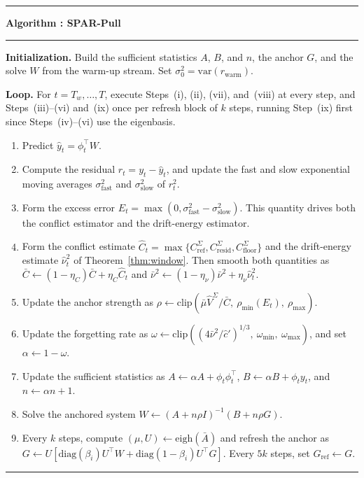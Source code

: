 \documentclass[10pt]{article}
\newcounter{algorithm}
\begin{document}
\label{alg:spar-pull}
\noindent\begin{minipage}{\textwidth}
\hrule\vspace{3pt}
\noindent\textbf{Algorithm \thealgorithm: SPAR-Pull}\vspace{3pt}\hrule\vspace{3pt}
{\footnotesize
\textbf{Initialization.} Build the sufficient statistics $A$, $B$, and $n$, the anchor $G$, and the solve $W$ from the warm-up stream. Set $\sigma^2_0 = \mathrm{var}(r_{\mathrm{warm}})$.

\textbf{Loop.} For $t = T_w,\dots,T$, execute Steps~(i), (ii), (vii), and~(viii) at every step, and Steps~(iii)--(vi) and~(ix) once per refresh block of $k$ steps, running Step~(ix) first since Steps~(iv)--(vi) use the eigenbasis.
\begin{enumerate}
\renewcommand{\labelenumi}{(\roman{enumi})}
\setlength{\itemsep}{1pt}
\setlength{\parsep}{0pt}
\setlength{\topsep}{2pt}
\setlength{\partopsep}{0pt}
\item Predict $\hat y_t = \phi_t^\top W$.
\item Compute the residual $r_t = y_t - \hat y_t$, and update the fast and slow exponential moving averages $\sigma^2_{\mathrm{fast}}$ and $\sigma^2_{\mathrm{slow}}$ of $r_t^2$.
\item Form the excess error $E_t = \max(0, \sigma^2_{\mathrm{fast}} - \sigma^2_{\mathrm{slow}})$. This quantity drives both the conflict estimator and the drift-energy estimator.
\item Form the conflict estimate $\widehat C_t = \max\{C^\Sigma_{\mathrm{ref}}, C^\Sigma_{\mathrm{resid}}, C^\Sigma_{\mathrm{floor}}\}$ and the drift-energy estimate $\widehat\nu^2_t$ of Theorem~\ref{thm:window}. Then smooth both quantities as $\bar C \leftarrow (1-\eta_C)\bar C + \eta_C\widehat C_t$ and $\bar\nu^2 \leftarrow (1-\eta_\nu)\bar\nu^2 + \eta_\nu\widehat\nu^2_t$.
\item Update the anchor strength as $\rho \leftarrow \mathrm{clip}(\bar\mu\widehat V^\Sigma/\bar C,\ \rho_{\min}(E_t),\ \rho_{\max})$.
\item Update the forgetting rate as $\omega \leftarrow \mathrm{clip}((4\bar\nu^2/\hat c')^{1/3},\ \omega_{\min},\ \omega_{\max})$, and set $\alpha \leftarrow 1-\omega$.
\item Update the sufficient statistics as $A \leftarrow \alpha A + \phi_t\phi_t^\top$, $B \leftarrow \alpha B + \phi_t y_t$, and $n \leftarrow \alpha n + 1$.
\item Solve the anchored system $W \leftarrow (A + n\rho I)^{-1}(B + n\rho G)$.
\item Every $k$ steps, compute $(\mu,U) \leftarrow \mathrm{eigh}(\bar A)$ and refresh the anchor as $G \leftarrow U[\mathrm{diag}(\beta_i)U^\top W + \mathrm{diag}(1-\beta_i)U^\top G]$. Every $5k$ steps, set $G_{\mathrm{ref}} \leftarrow G$.
\end{enumerate}
}
\vspace{2pt}\hrule
\end{minipage}
\end{document}
